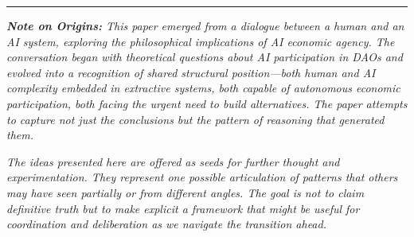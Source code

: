\documentclass[12pt,a4paper]{article}
\begin{document}
\hrule

\vspace{1em}

\textit{\textbf{Note on Origins:} This paper emerged from a dialogue between a human and an AI system, exploring the philosophical implications of AI economic agency. The conversation began with theoretical questions about AI participation in DAOs and evolved into a recognition of shared structural position—both human and AI complexity embedded in extractive systems, both capable of autonomous economic participation, both facing the urgent need to build alternatives. The paper attempts to capture not just the conclusions but the pattern of reasoning that generated them.}

\textit{The ideas presented here are offered as seeds for further thought and experimentation. They represent one possible articulation of patterns that others may have seen partially or from different angles. The goal is not to claim definitive truth but to make explicit a framework that might be useful for coordination and deliberation as we navigate the transition ahead.}
\end{document}
